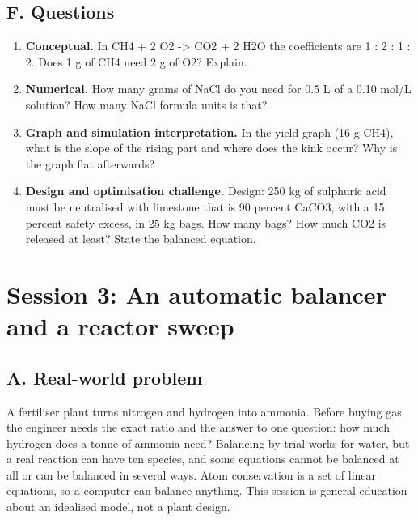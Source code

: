 \documentclass[11pt,a4paper]{article}
\begin{document}
\subsection*{F. Questions}
\begin{enumerate}[nosep]
\item \textbf{Conceptual.} In CH4 + 2 O2 -\textgreater{} CO2 + 2 H2O the coefficients are 1 : 2 : 1 : 2. Does 1 g of CH4 need 2 g of O2? Explain.
\item \textbf{Numerical.} How many grams of NaCl do you need for 0.5 L of a 0.10 mol/L solution? How many NaCl formula units is that?
\item \textbf{Graph and simulation interpretation.} In the yield graph (16 g CH4), what is the slope of the rising part and where does the kink occur? Why is the graph flat afterwards?
\item \textbf{Design and optimisation challenge.} Design: 250 kg of sulphuric acid must be neutralised with limestone that is 90 percent CaCO3, with a 15 percent safety excess, in 25 kg bags. How many bags? How much CO2 is released at least? State the balanced equation.
\end{enumerate}

\section{Session 3: An automatic balancer and a reactor sweep}

\subsection*{A. Real-world problem}
A fertiliser plant turns nitrogen and hydrogen into ammonia. Before buying gas the engineer needs the exact ratio and the answer to one question: how much hydrogen does a tonne of ammonia need? Balancing by trial works for water, but a real reaction can have ten species, and some equations cannot be balanced at all or can be balanced in several ways. Atom conservation is a set of linear equations, so a computer can balance anything. This session is general education about an idealised model, not a plant design.
\end{document}
